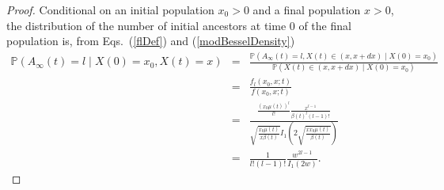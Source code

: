 \documentclass[preprint,12pt]{elsarticle}
\begin{document}
\begin{proof}
Conditional on an initial population $x_0 > 0$ and a final population $x > 0$, the distribution of the number of initial ancestors 
at time 0 of the final population is, from Eqs.~(\ref{flDef}) and (\ref{modBesselDensity}) 
\begin{eqnarray*}
\mathbb{P}(A_\infty(t)  = l \mid X(0) = x_0, X(t) = x)
	& = & \frac{\mathbb{P}(A_\infty(t)  = l, X(t) \in(x, x + dx) \mid X(0) = x_0)}{\mathbb{P}(X(t) \in(x, x + dx) \mid X(0) = x_0)}  \nonumber \\
 	& = & \frac{f_l(x_0, x; t)}{f(x_0, x; t)} \nonumber \\
	& = &  \frac{\frac{(x_0 \mu(t))^l}{l!} \frac{x^{l - 1}}{\beta(t)^l (l - 1)!}}
				{\sqrt{\frac{x_0\mu(t)}{x\beta(t)}} I_1 \left( 2\sqrt{\frac{xx_0\mu(t)}{\beta(t)}}\right)} \nonumber \\
	& = & \frac{1}{l!(l - 1)!} \frac{w^{2l - 1}}{I_1(2w)}.  
\end{eqnarray*} 


\end{proof}
\end{document}
